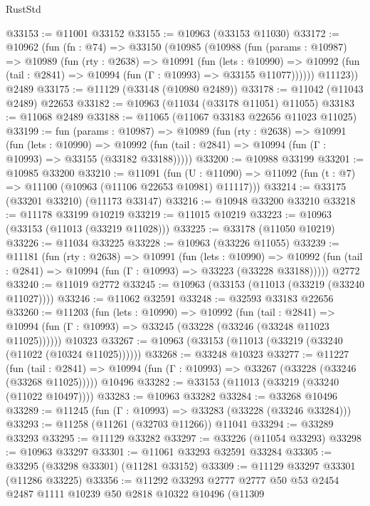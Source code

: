 \begin{lexlean}{RustStd}
\begin{coremodule}
@33153 := @11001 @33152
@33155 := @10963 (@33153 @11030)
@33172 := @10962
    (fun (fn : @74) =>
    @33150
      (@10985
        (@10988
          (fun (params : @10987) =>
          @10989
            (fun (rty : @2638) =>
            @10991
              (fun (lets : @10990) =>
              @10992 (fun (tail : @2841) => @10994 (fun (Γ : @10993) => @33155 @11077))))))
        @11123))
    @2489
@33175 := @11129 (@33148 (@10980 @2489))
@33178 := @11042 (@11043 @2489) @22653
@33182 := @10963 (@11034 (@33178 @11051) @11055)
@33183 := @11068 @2489
@33188 := @11065 (@11067 @33183 @22656 @11023 @11025)
@33199 := fun (params : @10987) =>
  @10989
    (fun (rty : @2638) =>
    @10991
      (fun (lets : @10990) =>
      @10992 (fun (tail : @2841) => @10994 (fun (Γ : @10993) => @33155 (@33182 @33188)))))
@33200 := @10988 @33199
@33201 := @10985 @33200
@33210 := @11091
    (fun (U : @11090) => @11092 (fun (t : @7) => @11100 (@10963 (@11106 @22653 @10981) @11117)))
@33214 := @33175 (@33201 @33210) (@11173 @33147)
@33216 := @10948 @33200 @33210
@33218 := @11178 @33199 @10219
@33219 := @11015 @10219
@33223 := @10963 (@33153 (@11013 (@33219 @11028)))
@33225 := @33178 (@11050 @10219)
@33226 := @11034 @33225
@33228 := @10963 (@33226 @11055)
@33239 := @11181
    (fun (rty : @2638) =>
    @10991
      (fun (lets : @10990) =>
      @10992 (fun (tail : @2841) => @10994 (fun (Γ : @10993) => @33223 (@33228 @33188)))))
    @2772
@33240 := @11019 @2772
@33245 := @10963 (@33153 (@11013 (@33219 (@33240 @11027))))
@33246 := @11062 @32591
@33248 := @32593 @33183 @22656
@33260 := @11203
    (fun (lets : @10990) =>
    @10992
      (fun (tail : @2841) =>
      @10994 (fun (Γ : @10993) => @33245 (@33228 (@33246 (@33248 @11023 @11025))))))
    @10323
@33267 := @10963 (@33153 (@11013 (@33219 (@33240 (@11022 (@10324 @11025))))))
@33268 := @33248 @10323
@33277 := @11227
    (fun (tail : @2841) => @10994 (fun (Γ : @10993) => @33267 (@33228 (@33246 (@33268 @11025)))))
    @10496
@33282 := @33153 (@11013 (@33219 (@33240 (@11022 @10497))))
@33283 := @10963 @33282
@33284 := @33268 @10496
@33289 := @11245 (fun (Γ : @10993) => @33283 (@33228 (@33246 @33284)))
@33293 := @11258 (@11261 (@32703 @11266)) @11041
@33294 := @33289 @33293
@33295 := @11129 @33282
@33297 := @33226 (@11054 @33293)
@33298 := @10963 @33297
@33301 := @11061 @33293 @32591 @33284
@33305 := @33295 (@33298 @33301) (@11281 @33152)
@33309 := @11129 @33297 @33301 (@11286 @33225)
@33356 := @11292
    @33293
    @2777
    @2777
    @50
    @53
    @2454
    @2487
    @1111
    @10239
    @50
    @2818
    @10322
    @10496
    (@11309

\end{coremodule}
\end{lexlean}
